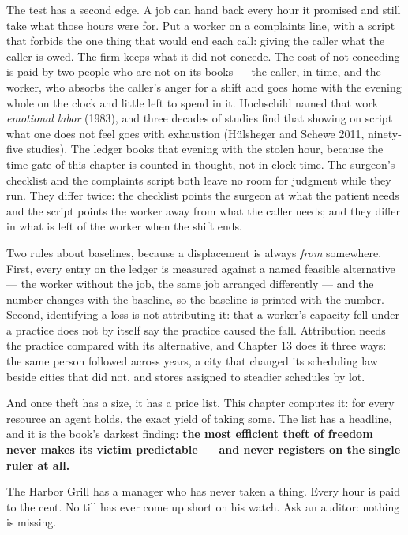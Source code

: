 The test has a second edge. A job can hand back every hour it promised
and still take what those hours were for. Put a worker on a complaints
line, with a script that forbids the one thing that would end each
call: giving the caller what the caller is owed. The firm keeps what it
did not concede. The cost of not conceding is paid by two people who
are not on its books --- the caller, in time, and the worker, who absorbs
the caller's anger for a shift and goes home with the evening whole on
the clock and little left to spend in it. Hochschild named that work
\emph{emotional labor} (1983), and three decades of studies find that
showing on script what one does not feel goes with exhaustion
(Hülsheger and Schewe 2011, ninety-five studies). The ledger books that
evening with the stolen hour, because the time gate of this chapter is
counted in thought, not in clock time. The surgeon's checklist and the
complaints script both leave no room for judgment while they run. They
differ twice: the checklist points the surgeon at what the patient
needs and the script points the worker away from what the caller
needs; and they differ in what is left of the worker when the shift
ends.

Two rules about baselines, because a displacement is always \emph{from}
somewhere. First, every entry on the ledger is measured against a named
feasible alternative --- the worker without the job, the same job
arranged differently --- and the number changes with the baseline, so the
baseline is printed with the number. Second, identifying a loss is not
attributing it: that a worker's capacity fell under a practice does not
by itself say the practice caused the fall. Attribution needs the
practice compared with its alternative, and Chapter 13 does it three
ways: the same person followed across years, a city that changed its
scheduling law beside cities that did not, and stores assigned to
steadier schedules by lot.

And once theft has a size, it has a price list. This chapter computes
it: for every resource an agent holds, the exact yield of taking some.
The list has a headline, and it is the book's darkest finding:
\textbf{the most efficient theft of freedom never makes its victim
predictable --- and never registers on the single ruler at all.}


The Harbor Grill has a manager who has never taken a thing. Every hour
is paid to the cent. No till has ever come up short on his watch. Ask
an auditor: nothing is missing.

